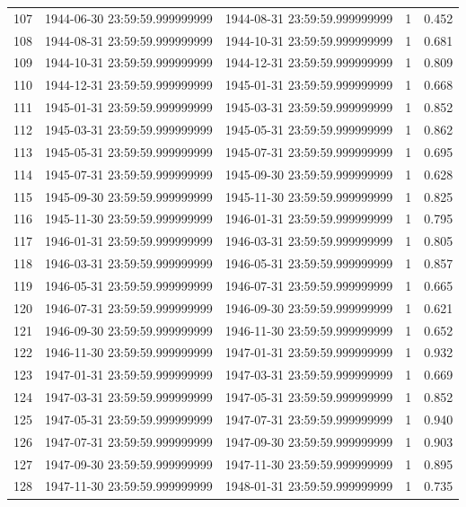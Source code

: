 \begin{table}
\begin{tabular}{lcccc}
107 & 1944-06-30 23:59:59.999999999 & 1944-08-31 23:59:59.999999999 & 1 & 0.452 \\
108 & 1944-08-31 23:59:59.999999999 & 1944-10-31 23:59:59.999999999 & 1 & 0.681 \\
109 & 1944-10-31 23:59:59.999999999 & 1944-12-31 23:59:59.999999999 & 1 & 0.809 \\
110 & 1944-12-31 23:59:59.999999999 & 1945-01-31 23:59:59.999999999 & 1 & 0.668 \\
111 & 1945-01-31 23:59:59.999999999 & 1945-03-31 23:59:59.999999999 & 1 & 0.852 \\
112 & 1945-03-31 23:59:59.999999999 & 1945-05-31 23:59:59.999999999 & 1 & 0.862 \\
113 & 1945-05-31 23:59:59.999999999 & 1945-07-31 23:59:59.999999999 & 1 & 0.695 \\
114 & 1945-07-31 23:59:59.999999999 & 1945-09-30 23:59:59.999999999 & 1 & 0.628 \\
115 & 1945-09-30 23:59:59.999999999 & 1945-11-30 23:59:59.999999999 & 1 & 0.825 \\
116 & 1945-11-30 23:59:59.999999999 & 1946-01-31 23:59:59.999999999 & 1 & 0.795 \\
117 & 1946-01-31 23:59:59.999999999 & 1946-03-31 23:59:59.999999999 & 1 & 0.805 \\
118 & 1946-03-31 23:59:59.999999999 & 1946-05-31 23:59:59.999999999 & 1 & 0.857 \\
119 & 1946-05-31 23:59:59.999999999 & 1946-07-31 23:59:59.999999999 & 1 & 0.665 \\
120 & 1946-07-31 23:59:59.999999999 & 1946-09-30 23:59:59.999999999 & 1 & 0.621 \\
121 & 1946-09-30 23:59:59.999999999 & 1946-11-30 23:59:59.999999999 & 1 & 0.652 \\
122 & 1946-11-30 23:59:59.999999999 & 1947-01-31 23:59:59.999999999 & 1 & 0.932 \\
123 & 1947-01-31 23:59:59.999999999 & 1947-03-31 23:59:59.999999999 & 1 & 0.669 \\
124 & 1947-03-31 23:59:59.999999999 & 1947-05-31 23:59:59.999999999 & 1 & 0.852 \\
125 & 1947-05-31 23:59:59.999999999 & 1947-07-31 23:59:59.999999999 & 1 & 0.940 \\
126 & 1947-07-31 23:59:59.999999999 & 1947-09-30 23:59:59.999999999 & 1 & 0.903 \\
127 & 1947-09-30 23:59:59.999999999 & 1947-11-30 23:59:59.999999999 & 1 & 0.895 \\
128 & 1947-11-30 23:59:59.999999999 & 1948-01-31 23:59:59.999999999 & 1 & 0.735 \\

\end{tabular}
\end{table}
